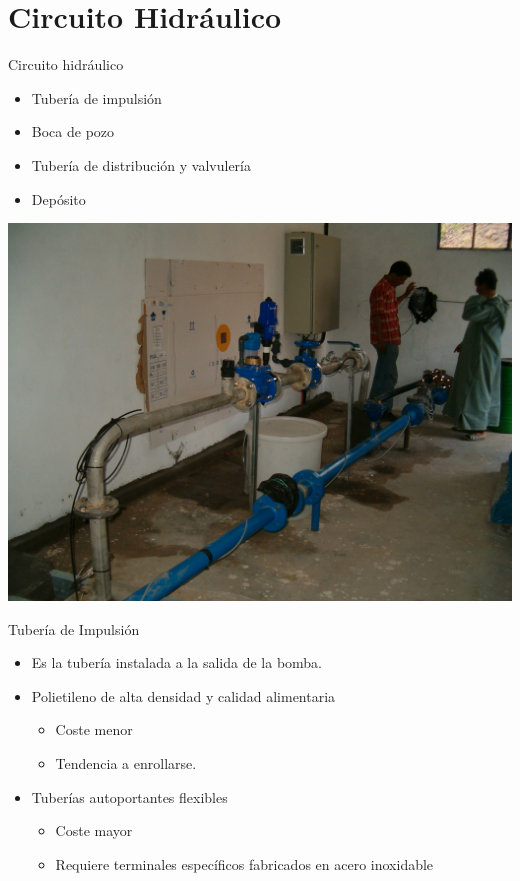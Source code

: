 \documentclass[xcolor={usenames,svgnames,dvipsnames}]{beamer}
\begin{document}
\section{Circuito Hidráulico}
\label{sec-4}

\begin{frame}[label=sec-4-0-1]{Circuito hidráulico}
\begin{itemize}
\item Tubería de impulsión

\item Boca de pozo

\item Tubería de distribución y valvulería

\item Depósito
\end{itemize}
\end{frame}

\begin{frame}[label=sec-4-0-2]{}
\includegraphics[width=.9\linewidth]{../figs/CircuitoHidraulico.jpg}
\end{frame}


\begin{frame}[label=sec-4-0-3]{Tubería de Impulsión}
\begin{itemize}
\item Es la tubería instalada a la salida de la bomba.

\item Polietileno de alta densidad y calidad alimentaria

\begin{itemize}
\item Coste menor

\item Tendencia a enrollarse.
\end{itemize}

\item Tuberías autoportantes flexibles

\begin{itemize}
\item Coste mayor

\item Requiere terminales específicos fabricados en acero inoxidable
\end{itemize}
\end{itemize}
\end{frame}
\end{document}
